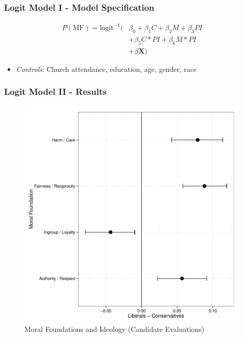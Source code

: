 \documentclass{beamer}
\begin{document}
\subsection{}
\begin{frame}%
  \frametitle{Logit Model I - Model Specification}
  \begin{align*}
    P(\text{MF}) = \text{logit}^{-1}(&\beta_0+\beta_1C+\beta_2M + \beta_3PI \\
    &+ \beta_5 C*PI + \beta_6 M*PI \\
    &+ \beta\mathbf{X})
  \end{align*}
  \begin{itemize}
    \item \emph{Controls}: Church attendance, education, age, gender, race
  \end{itemize}
\end{frame}

\begin{frame}%
  \frametitle{Logit Model II - Results}
  \begin{figure}[ht]\centering
    \includegraphics[height=.75\textheight]{p4_models}
    \caption{Moral Foundations and Ideology (Candidate Evaluations)}
  \end{figure}
\end{frame}
\end{document}
